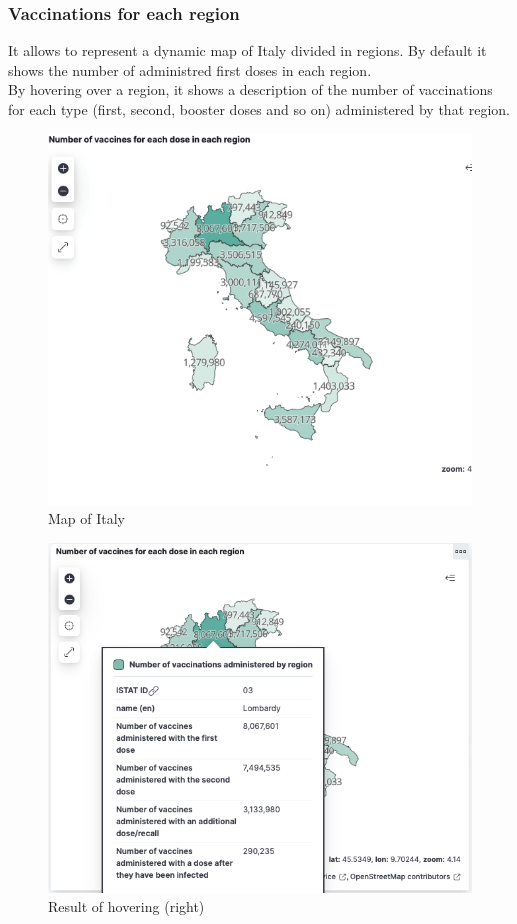\documentclass[12pt, a4paper]{article}
\begin{document}
\subsubsection{Vaccinations for each region}
It allows to represent a dynamic map of Italy divided in regions. By default it shows the
number of administred first doses in each region. \\ 
By hovering over a region, it shows a description of the number of vaccinations for each
type (first, second, booster doses and so on) administered by that region.
\begin{figure}[ht]
  \centering
  \includegraphics[width=.8\linewidth]{img (4)bis.png}
\caption*{Map of Italy}
\end{figure}
\begin{figure}[ht]
  \centering
  \includegraphics[width=.8\linewidth]{img (5).png}
\caption*{Result of hovering (right)}
\end{figure}
\end{document}
